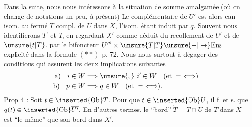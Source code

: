 Dans la suite, nous nous intéressons
 à la situation de somme amalgamée
(où on change de notations un peu, à
présent)
Le  complémentaire de $U'$  est alors
can. isom. au fermé $T$ compl. de $U$ dans
$X$, l'isom. étant induit par $q$. Souvent
nous identifierons $T'$ et $T$,  en regardant
$X'$ comme déduit du recollement de
$U'$ et de $\unsure{t|T}$, par le bifoncteur $\mathord{U'}^{\mathrm o}\times\unsure{\bar T|T}\unsure{-|\to}\mathrm{Ens}$
explicité dans la formule $(**)$ p. 72. Nous
nous  surtout à dégager des conditions
qui assurent les deux implications suivantes
\[
\begin{aligned}
\text{a)}\quad i\in W&\Longrightarrow\unsure{,}\ i'\in W\quad(\text{et }=\ \Longleftrightarrow)\\
\text{b)}\quad p\in W&\Longrightarrow q\in W\quad(\text{et }=\ \Longleftrightarrow).
\end{aligned}
\]
\uline{Prop 4} : Soit $t\in\inserted{\operatorname{Ob}}T$. Pour que $t\in\inserted{\operatorname{Ob}}\bar U$, il f. et s. que
$q(t)\in\inserted{\operatorname{Ob}}\overline{U'}$. En d'autres termes, le ``bord'' $\dot T=T\cap\bar U$ de $T$
dans $X$ est ``le même'' que son bord dans $X'$.

